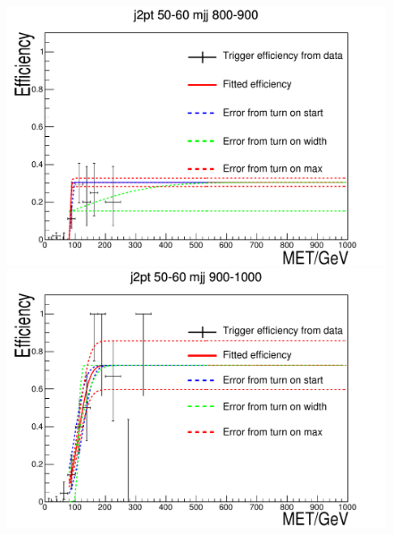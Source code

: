 \begin{figure}[h!]
  \begin{center}
    \includegraphics[width=.6\largefigwidth]{plots/parked/trigfitplots/hData_MET_1D_33A.pdf}
    \includegraphics[width=.6\largefigwidth]{plots/parked/trigfitplots/hData_MET_1D_34A.pdf}


\end{center}
\end{figure}
